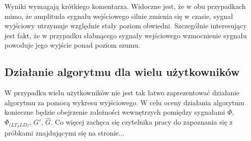 \noindent Wyniki wymagają krótkiego komentarza. Widoczne jest, że w obu przypadkach mimo, że amplituda sygnału wejściowego silnie zmienia się w czasie, sygnał wyjściowy utrzymuje względnie stały poziom obwiedni. Szczególnie interesujący jest fakt, że w przypadku słabnącego sygnały wejściowego wzmocnienie sygnału powoduje jego wyjście ponad poziom szumu.

\subsection{Działanie algorytmu dla wielu użytkowników}

W przypadku wielu użytkowników nie jest tak łatwo zaprezentować działanie algorytmu za pomocą wykresu wyjściowego. W celu oceny działania algorytmu konieczne będzie obejrzenie zależności wewnętrzych pomiędzy sygnałami $\Phi$, $\Phi_{\mathrm(LT_SLD)}$, $G'$, $\widehat{G}$. Co więcej zachęca się czytelnika pracy do zapoznania się z próbkami znajdującymi się na stronie...











